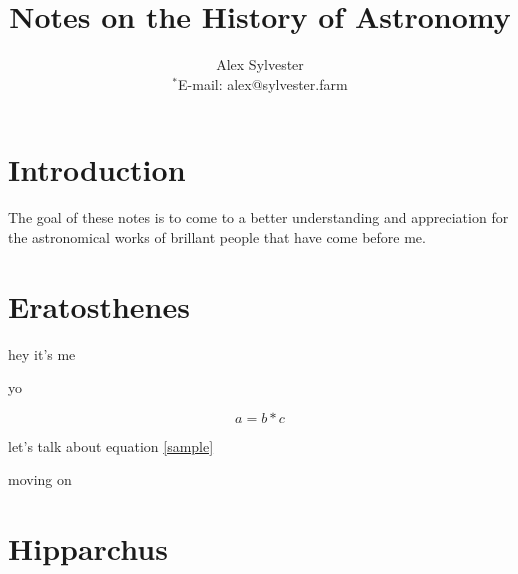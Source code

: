 \documentclass[11pt]{article} %
\title{Notes on the History of Astronomy}
\author
{Alex Sylvester
\\
\normalsize{$^\ast$E-mail: alex@sylvester.farm}
}
\date{}
\newcommand{\be}{\begin{equation}}
\newcommand{\ee}{\end{equation}}
\begin{document}
 
\maketitle 
\section{Introduction}
  The goal of these notes is to come to a better understanding and appreciation for the astronomical works of brillant people that have come before me.

\section{Eratosthenes}
hey it's me

yo

\be 
\label{sample}
  a=b*c
\ee

let's talk about equation \ref{sample}

moving on

\section{Hipparchus}
\end{document}
